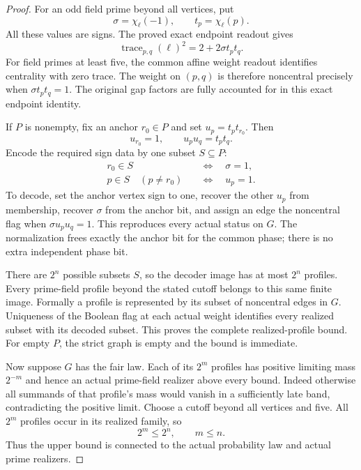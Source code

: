 \documentclass[11pt]{article}
\begin{document}
\begin{proof}
For an odd field prime beyond all vertices, put
\[
                         \sigma=\chi_\ell(-1),
                  \qquad t_p=\chi_\ell(p).
\]
All these values are signs. The proved exact endpoint readout gives
\[
              \operatorname{trace}_{p,q}(\ell)^2
                                 =2+2\sigma t_pt_q.
\]
For field primes at least five, the common affine weight readout
identifies centrality with zero trace. The weight on \((p,q)\)
is therefore noncentral precisely when \(\sigma t_pt_q=1\).
The original gap factors are fully accounted for in this exact
endpoint identity.

If \(P\) is nonempty, fix an anchor \(r_0\in P\) and set
\(u_p=t_pt_{r_0}\). Then
\[
                        u_{r_0}=1,\qquad u_pu_q=t_pt_q.
\]
Encode the required sign data by one subset \(S\subseteq P\):
\[
 \begin{aligned}
 r_0\in S&\quad\Longleftrightarrow\quad\sigma=1,\\
 p\in S\quad(p\ne r_0)&\quad\Longleftrightarrow\quad u_p=1.
 \end{aligned}
\]
To decode, set the anchor vertex sign to one, recover the other
\(u_p\) from membership, recover \(\sigma\) from the anchor bit,
and assign an edge the noncentral flag when \(\sigma u_pu_q=1\).
This reproduces every actual status on \(G\).
The normalization frees exactly the anchor bit for the common phase;
there is no extra independent phase bit.

There are \(2^n\) possible subsets \(S\), so the decoder image has
at most \(2^n\) profiles. Every prime-field profile beyond the stated
cutoff belongs to this same finite image.
Formally a profile is represented by its subset of noncentral
edges in \(G\). Uniqueness of the Boolean flag at each actual weight
identifies every realized subset with its decoded subset.
This proves the complete realized-profile bound.
For empty \(P\), the strict graph is empty and the bound is immediate.

Now suppose \(G\) has the fair law.
Each of its \(2^m\) profiles has positive limiting mass \(2^{-m}\)
and hence an actual prime-field realizer above every bound.
Indeed otherwise all summands of that profile's mass would vanish
in a sufficiently late band, contradicting the positive limit.
Choose a cutoff beyond all vertices and five.
All \(2^m\) profiles occur in its realized family, so
\[
                              2^m\leq2^n,\qquad m\leq n.
\]
Thus the upper bound is connected to the actual probability law
and actual prime realizers.


\end{proof}
\end{document}
